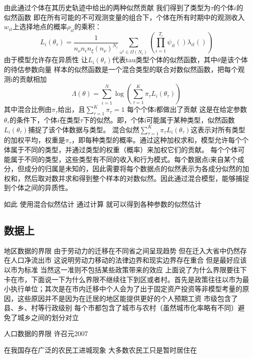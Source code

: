 \documentclass{article}
\numberwithin{equation}{section} %
\begin{document}
由此通过个体在其历史轨迹中给出的两种似然贡献
我们得到了类型为$\tau$的个体$i$的似然函数
即在所有可能的不可观测变量的组合下，个体在所有时期中的观测收入$w_{it}$上选择地点的概率$\rho_{it}$的乘积：
$$L_{i}(\theta_{\tau})=\frac{1}{n_{\nu}n_{\epsilon}n_{\xi}(n_{\nu})^{N_{i}}} \sum\limits_{\omega^{i}\in\Omega(N_{i})}(\prod\limits_{i=1}^{T_{i}} \psi_{it}() \lambda_{it}())$$
由于模型允许存在异质性
让$L_{i}(\theta_{\tau})$代表tau类型个体的似然函数，其中$\theta$是该个体的待估参数向量
样本的似然函数是一个混合类型的联合对数似然函数，把每个观测i的贡献相加
\begin{equation}
\Lambda(\theta)=\sum\limits_{i=1}^{N}\log(\sum\limits_{\tau=1}^{K}\pi_{\tau}L_{i}(\theta_{\tau})) 
\end{equation}
其中混合比例由$\pi_{\tau}$给出，且$\sum\limits_{\tau=1}^{K}\pi_{\tau}=1$
每个个体i都做出了贡献
这是在给定参数$\theta_{\tau}$的条件下，个体$i$在类型$\tau$下的似然。即，个体i可能属于某种类型，似然函数$L_i(\theta_{\tau})$捕捉了该个体数据与类型。
混合似然$\sum_{\tau=1}^{K} \pi_{\tau} L_i(\theta_{\tau})$这表示对所有类型的加权平均，权重是$\pi_{\tau}​$，即每种类型的概率。通过这种加权求和，模型允许每个个体属于不同的类型，并通过类型的权重（概率）来加权它们的贡献。
每个个体可能属于不同的类型，这些类型有不同的收入和行为模式。每个数据点i来自某个成分，但成分的归属是未知的，因此需要将每个数据点的似然表示为各成分似然的加权和，然后取对数并求和得到整个样本的对数似然。因此通过混合模型，能够捕捉到个体之间的异质性。


如此
使用混合似然估计
通过计算
就可以得到各种参数的似然估计




\subsection{数据上}

地区数据的界限
由于劳动力的迁移在不同省之间呈现趋势 但在迁入大省中仍然存在人口净流出市 这说明劳动力移动的法律边界和现实边界存在重合 但是最好应该以市为标准 当然这一准则不包括某些政策带来的效应
上面说了为什么界限要往下卡在市，下面说一下为什么界限不继续往下到区或者村。首先是政策往往以市为最小执行单位；其次是在市内迁移中个人会为了出于固定资产投资等非模型考量的原因，这些原因并不是因为在迁居的地区能提供更好的个人预期工资
市级包含了县、乡、村等行政级别 每个市都包含了城市与农村（虽然城市化率略有不同）避免了城乡之间的划分对立


人口数据的界限
许召元2007

在我国存在广泛的农民工进城现象 大多数农民工只是暂时居住在
\end{document}
